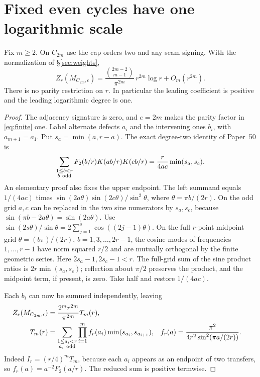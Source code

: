 \section{Fixed even cycles have one logarithmic scale}\label{sec:cycles}

\begin{theorem}\label{thm:cycle}
Fix \(m\ge2\). On \(C_{2m}\) use the cap orders two and any seam
signing. With the normalization of \S\ref{sec:weights},
\[
 Z_r(M_{C_{2m},\epsilon})=
 \frac{\binom{2m-2}{m-1}}{\pi^{2m}}\, r^{2m}\log r
     +O_m(r^{2m}).
\]
There is no parity restriction on \(r\). In particular the leading
coefficient is positive and the leading logarithmic degree is one.
\end{theorem}

\begin{proof}
The adjacency signature is zero, and \(e=2m\) makes the parity
factor in \eqref{eq:finite} one. Label alternate defects \(a_i\)
and the intervening ones \(b_i\), with \(a_{m+1}=a_1\).
Put \(s_a=\min(a,r-a)\). The exact degree-two identity of
Paper~50 \cite{P50} is
\begin{equation}\label{eq:transfer}
 \sum_{\substack{1\le b<r\\ b\ {\rm odd}}}
 F_2(b/r)K(ab/r)K(cb/r)
 =\frac{r}{4ac}\min(s_a,s_c).
\end{equation}
An elementary proof also fixes the upper endpoint. The left
summand equals \(1/(4ac)\) times
\(\sin(2a\theta)\sin(2c\theta)/\sin^2\theta\), where
\(\theta=\pi b/(2r)\). On the odd grid \(a,c\) can be replaced
in the two sine numerators by \(s_a,s_c\), because
\(\sin(\pi b-2a\theta)=\sin(2a\theta)\).
Use \(\sin(2s\theta)/\sin\theta=2\sum_{j=1}^{s}
\cos((2j-1)\theta)\). On the full \(r\)-point midpoint grid
\(\theta=(b\pi)/(2r)\), \(b=1,3,\ldots,2r-1\), the cosine
modes of frequencies \(1,\ldots,r-1\) have norm squared \(r/2\)
and are mutually orthogonal by the finite geometric series.
Here \(2s_a-1,2s_c-1<r\). The full-grid sum of the sine product
ratios is \(2r\min(s_a,s_c)\); reflection about \(\pi/2\)
preserves the product, and the midpoint term, if present, is zero.
Take half and restore \(1/(4ac)\).

Each \(b_i\) can now be summed independently, leaving
\begin{align}
 Z_r(M_{C_{2m},\epsilon})
   &=\frac{2^m r^{2m}}{\pi^{2m}}T_m(r),\label{eq:Treln}\\
 T_m(r)
   &=\sum_{\substack{1\le a_i<r\\ a_i\ {\rm odd}}}
       \prod_{i=1}^m f_r(a_i)\min(s_{a_i},s_{a_{i+1}}),&
 f_r(a)&=\frac{\pi^2}{4r^2\sin^2(\pi a/(2r))}.\notag
\end{align}
Indeed \(I_r=(r/4)^m T_m\), because each \(a_i\) appears as
an endpoint of two transfers, so \(f_r(a)=a^{-2}F_2(a/r)\).
The reduced sum is positive termwise.


\end{proof}
